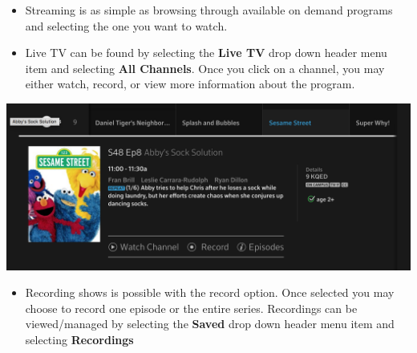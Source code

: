 \documentclass[a4paper, 11pt]{article}
\begin{document}
\begin{itemize}
  \item Streaming is as simple as browsing through available on demand 
  programs and selecting the one you want to watch.
  \item Live TV can be found by selecting the \textbf{Live TV} drop down 
  header menu item and selecting \textbf{All Channels}.  Once you click
  on a channel, you may either watch, record, or view more information
  about the program.
\end{itemize}
\includegraphics[width=\linewidth, keepaspectratio]{seas.png}
\begin{itemize}
  \item Recording shows is possible with the record option.  Once selected
  you may choose to record one episode or the entire series.  Recordings 
  can be viewed/managed by selecting the \textbf{Saved} drop down header
  menu item and selecting \textbf{Recordings}
\end{itemize}
\end{document}
